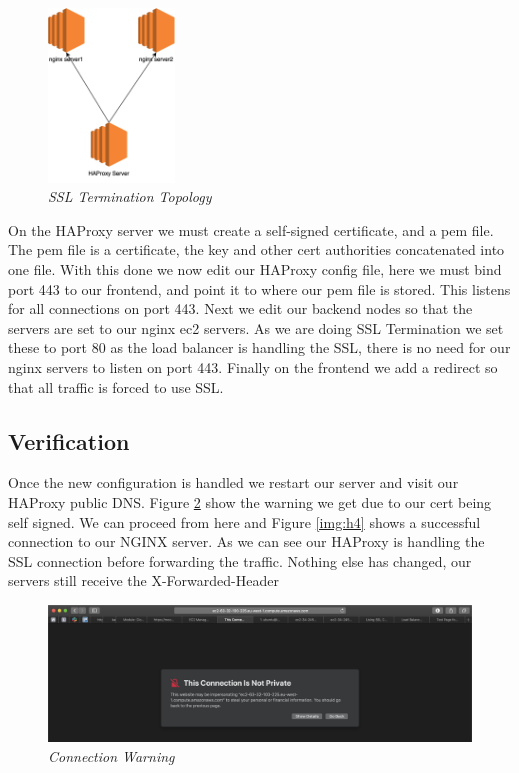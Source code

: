 \begin{figure}[!hb]
\centering
\includegraphics*[width=0.3\textwidth]{images/h6.png}
\caption{\em SSL Termination Topology}
\label{img:h6}
\end{figure}

On the HAProxy server we must create a self-signed certificate, and a pem file. The pem file is a certificate, the key and other cert authorities concatenated into one file. With this done we now edit our HAProxy config file, here we must bind port 443 to our frontend, and point it to where our pem file is stored. This listens for all connections on port 443. Next we edit our backend nodes so that the servers are set to our nginx ec2 servers. As we are doing SSL Termination we set these to port 80 as the load balancer is handling the SSL, there is no need for our nginx servers to listen on port 443. Finally on the frontend we add a redirect so that all traffic is forced to use SSL.

\subsection{Verification}
Once the new configuration is handled we restart our server and visit our HAProxy public DNS. Figure \ref{img:h5} show the warning we get due to our cert being self signed. We can proceed from here and Figure \ref{img:h4} shows a successful connection to our NGINX server. As we can see our HAProxy is handling the SSL connection before forwarding the traffic. Nothing else has changed, our servers still receive the X-Forwarded-Header
\begin{figure}[!hb]
\centering
\includegraphics*[width=1\textwidth]{images/h5.png}
\caption{\em Connection Warning}
\label{img:h5}
\end{figure}

